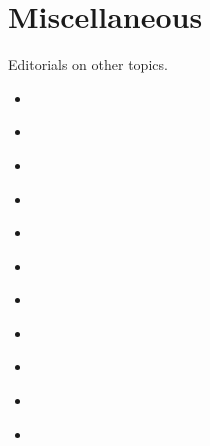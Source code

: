 \documentclass[letterpaper,10pt,english]{jupyterBook}
\begin{document}
\section{Miscellaneous}
\label{\detokenize{Sections/misc:miscellaneous}}\label{\detokenize{Sections/misc::doc}}
\sphinxAtStartPar
Editorials on other topics.
\begin{itemize}
\item {} 
\sphinxAtStartPar
{\hyperref[\detokenize{Volumes/18/03/reconstruction::doc}]{}}

\item {} 
\sphinxAtStartPar
{\hyperref[\detokenize{Volumes/28/01/lunatic_or_a_traitor::doc}]{}}

\item {} 
\sphinxAtStartPar
{\hyperref[\detokenize{Volumes/28/03/helping_africa::doc}]{}}

\item {} 
\sphinxAtStartPar
{\hyperref[\detokenize{Volumes/38/03/woofterism::doc}]{}}

\item {} 
\sphinxAtStartPar
{\hyperref[\detokenize{Volumes/34/02/farmers::doc}]{}}

\item {} 
\sphinxAtStartPar
{\hyperref[\detokenize{Volumes/39/04/platform_for_radicals::doc}]{}}

\item {} 
\sphinxAtStartPar
{\hyperref[\detokenize{Volumes/39/08/blaine_of_maine::doc}]{}}

\item {} 
\sphinxAtStartPar
{\hyperref[\detokenize{Volumes/40/02/our_rate_of_increase::doc}]{}}

\item {} 
\sphinxAtStartPar
{\hyperref[\detokenize{Volumes/40/02/our_health::doc}]{}}

\item {} 
\sphinxAtStartPar
{\hyperref[\detokenize{Volumes/40/02/its_a_girl::doc}]{}}

\item {} 
\sphinxAtStartPar
{\hyperref[\detokenize{Volumes/40/02/dodging_the_issue::doc}]{}}


\end{itemize}
\end{document}
